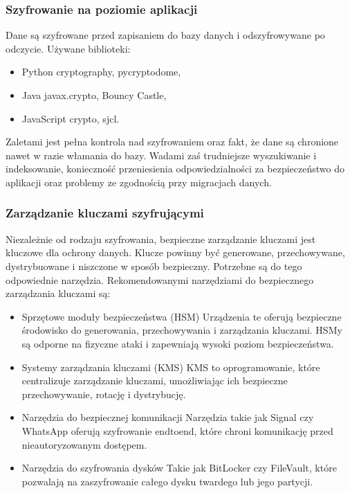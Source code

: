 \documentclass[letterpaper,10pt,polish]{sphinxmanual}
\begin{document}
\subsubsection{Szyfrowanie na poziomie aplikacji}
\label{\detokenize{rozdzial2/bezpieczenstwo/index:szyfrowanie-na-poziomie-aplikacji}}
\sphinxAtStartPar
Dane są szyfrowane przed zapisaniem do bazy danych i odszyfrowywane po odczycie. Używane biblioteki:
\begin{itemize}
\item {} 
\sphinxAtStartPar
Python \textendash{} cryptography, pycryptodome,

\item {} 
\sphinxAtStartPar
Java \textendash{} javax.crypto, Bouncy Castle,

\item {} 
\sphinxAtStartPar
JavaScript \textendash{} crypto, sjcl.

\end{itemize}

\sphinxAtStartPar
Zaletami jest pełna kontrola nad szyfrowaniem oraz fakt, że dane są chronione nawet w razie włamania do bazy. Wadami zaś trudniejsze wyszukiwanie i indeksowanie, konieczność przeniesienia odpowiedzialności za bezpieczeństwo do aplikacji oraz problemy ze zgodnością przy migracjach danych.


\subsubsection{Zarządzanie kluczami szyfrującymi}
\label{\detokenize{rozdzial2/bezpieczenstwo/index:zarzadzanie-kluczami-szyfrujacymi}}
\sphinxAtStartPar
Niezależnie od rodzaju szyfrowania, bezpieczne zarządzanie kluczami jest kluczowe dla ochrony danych. Klucze powinny być generowane, przechowywane, dystrybuowane i niszczone w sposób bezpieczny. Potrzebne są do tego odpowiednie narzędzia. Rekomendowanymi narzędziami do bezpiecznego zarządzania kluczami są:
\begin{itemize}
\item {} 
\sphinxAtStartPar
Sprzętowe moduły bezpieczeństwa (HSM) \sphinxhyphen{} Urządzenia te oferują bezpieczne środowisko do generowania, przechowywania i zarządzania kluczami. HSM\sphinxhyphen{}y są odporne na fizyczne ataki i zapewniają wysoki poziom bezpieczeństwa.

\item {} 
\sphinxAtStartPar
Systemy zarządzania kluczami (KMS) \sphinxhyphen{} KMS to oprogramowanie, które centralizuje zarządzanie kluczami, umożliwiając ich bezpieczne przechowywanie, rotację i dystrybucję.

\item {} 
\sphinxAtStartPar
Narzędzia do bezpiecznej komunikacji \sphinxhyphen{} Narzędzia takie jak Signal czy WhatsApp oferują szyfrowanie end\sphinxhyphen{}to\sphinxhyphen{}end, które chroni komunikację przed nieautoryzowanym dostępem.

\item {} 
\sphinxAtStartPar
Narzędzia do szyfrowania dysków \sphinxhyphen{} Takie jak BitLocker czy FileVault, które pozwalają na zaszyfrowanie całego dysku twardego lub jego partycji.

\end{itemize}
\end{document}
